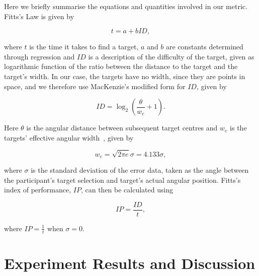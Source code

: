 \documentclass[sigconf, screen=true, anonymous=true]{acmart}
\begin{document}
Here we briefly summarise the equations and quantities involved in our metric.
Fitts's Law is given by  

\begin{equation}
  \label{eq:fitts-base}
  t = a + bID,
\end{equation}

\noindent
where $t$ is the time it takes to find a target, $a$ and $b$ are constants determined through regression and $ID$ is a description of the difficulty of the target, given as logarithmic function of the ratio between the distance to the target and the target's width.
In our case, the targets have no width, since they are points in space, and we therefore use MacKenzie's modified form for $ID$, given by

\begin{equation}
  \label{eq:fitts-id}
  ID = \log_2\left(\frac{\theta}{w_e} + 1\right).
\end{equation}

\noindent
Here $\theta$ is the angular distance between subsequent target centres and $w_e$ is the targets' effective angular width~\cite{welford1968fundamentals}, given by

\begin{equation}
  \label{eq:fitts-we}
  w_e = \sqrt{2\pi e}\sigma = 4.133\sigma,
\end{equation}

\noindent
where $\sigma$ is the standard deviation of the error data, taken as the angle between the participant's target selection and target's actual angular position.
Fitts's index of performance, $IP$, can then be calculated using 

\begin{equation}
  \label{eq:fitts-performance}
  IP = \frac{ID}{t},
\end{equation}

\noindent
where $IP = \frac{1}{t}$ when $\sigma=0$.

\section{Experiment Results and Discussion}
\label{sec:results}


\end{document}
